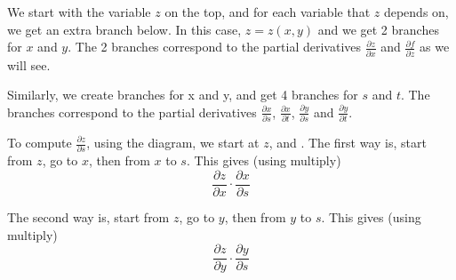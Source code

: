 \documentclass[11pt,fleqn]{book} %
\begin{document}
\begin{center}
\end{center}

We start with the variable $z$ on the top, and for each variable that $z$ depends on, we get an extra branch below. In this case, $z = z(x, y)$ and we get 2 branches for $x$ and $y$. The 2 branches correspond to the partial derivatives $\frac{\partial z}{\partial x}$ and $\frac{\partial f}{\partial z}$ as we will see. 

Similarly, we create branches for x and y, and get 4 branches for $s$ and $t$. The branches correspond to the partial derivatives $\frac{\partial x}{\partial s}$, $\frac{\partial x}{\partial t}$, $\frac{\partial y}{\partial s}$ and $\frac{\partial y}{\partial t}$. 

To compute $\frac{\partial z}{\partial s}$, using the diagram, we start at $z$, and . The first way is, start from $z$, go to $x$, then from $x$ to $s$. This gives (using multiply) $$\frac{\partial z}{\partial x} \cdot \frac{\partial x}{\partial s}$$ 

The second way is, start from $z$, go to $y$, then from $y$ to $s$. This gives (using multiply) $$\frac{\partial z}{\partial y} \cdot \frac{\partial y}{\partial s}$$
\end{document}
